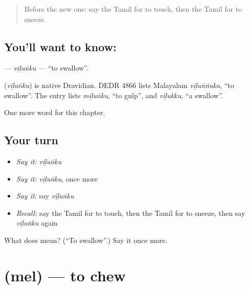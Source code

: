 \label{lesson:TA-C226-vilunku}



\begin{quote}
Before the new one: say the Tamil for to touch, then the Tamil for to sneeze.
\end{quote}

\subsection*{You'll want to know: }
\textbf{} — \emph{viḻuṅku} — \textquotedblleft{}to swallow\textquotedblright{}.

\begin{cousinweb}
\textbf{} (\emph{viḻuṅku}) is native Dravidian. DEDR 4866 lists Malayalam \emph{viḻuṅṅuka}, \textquotedblleft{}to swallow\textquotedblright{}. The entry lists \emph{miḻuṅku}, \textquotedblleft{}to gulp\textquotedblright{}, and \emph{viḻukku}, \textquotedblleft{}a swallow\textquotedblright{}.
\end{cousinweb}

\begin{grammarlens}[title={What you've built}]
One more word for this chapter.
\end{grammarlens}

\subsection*{Your turn}
\begin{itemize}
\raggedright
  \item \emph{Say it:} \emph{viḻuṅku}
  \item \emph{Say it:} \emph{viḻuṅku}, once more
  \item \emph{Say it:} say \emph{viḻuṅku}
  \item \emph{Recall:} say the Tamil for to touch, then the Tamil for to sneeze, then say \emph{viḻuṅku} again
\end{itemize}

\begin{tcolorbox}[breakable,colback=teal!4,colframe=teal!35!black,title={Before you move on}]
What does  mean? (\textquotedblleft{}To swallow\textquotedblright{}.) Say it once more.
\end{tcolorbox}
\section[\texorpdfstring{\ta{மெல்} (mel)}{மெல் (mel)}]{ (mel) — to chew}

